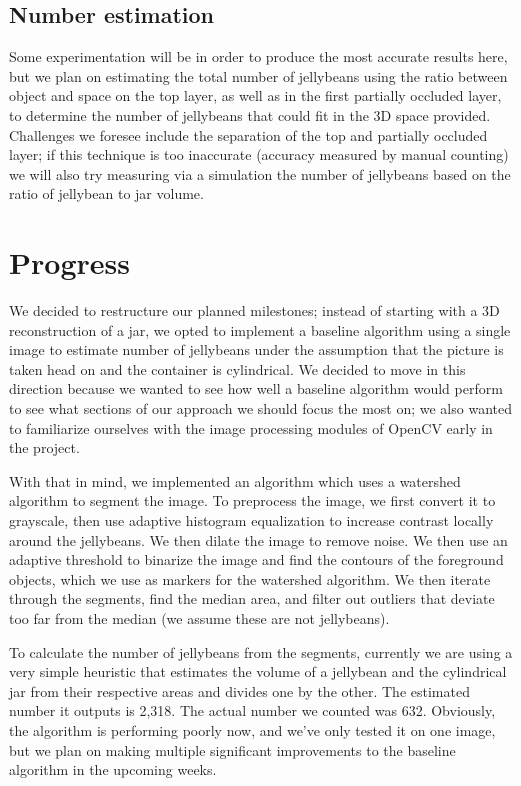 \documentclass{article}
\begin{document}
\subsection*{Number estimation} 

Some experimentation will be in order to produce the most accurate results here, but we plan on estimating the total number of jellybeans using the ratio between object and space on the top layer, as well as in the first partially occluded layer, to determine the number of jellybeans that could fit in the 3D space provided. Challenges we foresee include the separation of the top and partially occluded layer; if this technique is too inaccurate (accuracy measured by manual counting) we will also try measuring via a simulation the number of jellybeans based on the ratio of jellybean to jar volume.

\section*{Progress}

We decided to restructure our planned milestones; instead of starting with a 3D reconstruction of a jar, we opted to implement a baseline algorithm using a single image to estimate number of jellybeans under the assumption that the picture is taken head on and the container is cylindrical. We decided to move in this direction because we wanted to see how well a baseline algorithm would perform to see what sections of our approach we should focus the most on; we also wanted to familiarize ourselves with the image processing modules of OpenCV early in the project.

With that in mind, we implemented an algorithm which uses a watershed algorithm to segment the image. To preprocess the image, we first convert it to grayscale, then use adaptive histogram equalization to increase contrast locally around the jellybeans. We then dilate the image to remove noise. We then use an adaptive threshold to binarize the image and find the contours of the foreground objects, which we use as markers for the watershed algorithm. We then iterate through the segments, find the median area, and filter out outliers that deviate too far from the median (we assume these are not jellybeans).

To calculate the number of jellybeans from the segments, currently we are using a very simple heuristic that estimates the volume of a jellybean and the cylindrical jar from their respective areas and divides one by the other. The estimated number it outputs is 2,318. The actual number we counted was 632. Obviously, the algorithm is performing poorly now, and we've only tested it on one image, but we plan on making multiple significant improvements to the baseline algorithm in the upcoming weeks.
\end{document}
